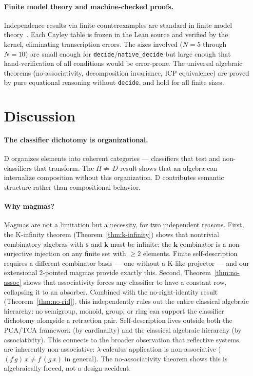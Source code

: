 \documentclass[sigconf,screen,review,anonymous]{acmart}
\theoremstyle{remark}
\begin{document}
\paragraph{Finite model theory and machine-checked proofs.}
Independence results via finite counterexamples are standard in finite model theory~\cite{libkin04}. Each Cayley table is frozen in the Lean source and verified by the kernel, eliminating transcription errors. The sizes involved ($N\!=\!5$ through $N\!=\!10$) are small enough for \texttt{decide}/\texttt{native\_decide} but large enough that hand-verification of all conditions would be error-prone. The universal algebraic theorems (no-associativity, decomposition invariance, ICP equivalence) are proved by pure equational reasoning without \texttt{decide}, and hold for all finite sizes.

\section{Discussion}
\label{sec:discussion}

\paragraph{The classifier dichotomy is organizational.}
D organizes elements into coherent categories --- classifiers that test and non-classifiers that transform. The $H \not\Rightarrow D$ result shows that an algebra can internalize composition without this organization. D contributes semantic structure rather than compositional behavior.

\paragraph{Why magmas?}
Magmas are not a limitation but a necessity, for two independent reasons. First, the K-infinity theorem (Theorem~\ref{thm:k-infinity}) shows that nontrivial combinatory algebras with $\mathbf{s}$ and $\mathbf{k}$ must be infinite: the $\mathbf{k}$ combinator is a non-surjective injection on any finite set with $\geq 2$ elements. Finite self-description requires a different combinator basis --- one without a K-like projector --- and our extensional 2-pointed magmas provide exactly this. Second, Theorem~\ref{thm:no-assoc} shows that associativity forces any classifier to have a constant row, collapsing it to an absorber. Combined with the no-right-identity result (Theorem~\ref{thm:no-rid}), this independently rules out the entire classical algebraic hierarchy: no semigroup, monoid, group, or ring can support the classifier dichotomy alongside a retraction pair. Self-description lives outside both the PCA/TCA framework (by cardinality) and the classical algebraic hierarchy (by associativity). This connects to the broader observation that reflective systems are inherently non-associative: $\lambda$-calculus application is non-associative ($(f\,g)\,x \neq f\,(g\,x)$ in general). The no-associativity theorem shows this is algebraically forced, not a design accident.
\end{document}
